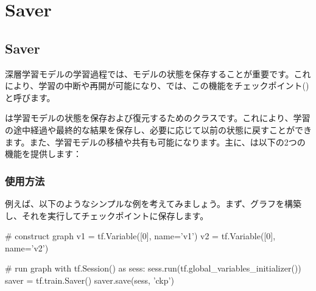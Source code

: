 \begin{savequote}[45mm]
\end{savequote}

\chapter{Saver} 
\label{ch:saver}

\section{Saver}

\begin{content}

深層学習モデルの学習過程では、モデルの状態を保存することが重要です。これにより、学習の中断や再開が可能になり、\tf{}では、この機能をチェックポイント()と呼びます。

は学習モデルの状態を保存および復元するためのクラスです。これにより、学習の途中経過や最終的な結果を保存し、必要に応じて以前の状態に戻すことができます。また、学習モデルの移植や共有も可能になります。主に、は以下の2つの機能を提供します：

\begin{enum}
\end{enum}

\subsection{使用方法}

例えば、以下のようなシンプルな例を考えてみましょう。まず、グラフを構築し、それを実行してチェックポイントに保存します。

\begin{leftbar}
\begin{python}
# construct graph
v1 = tf.Variable([0], name='v1')
v2 = tf.Variable([0], name='v2')

# run graph
with tf.Session() as sess:
  sess.run(tf.global_variables_initializer())
  saver = tf.train.Saver()
  saver.save(sess, 'ckp')
\end{python}
\end{leftbar}


\end{content}
